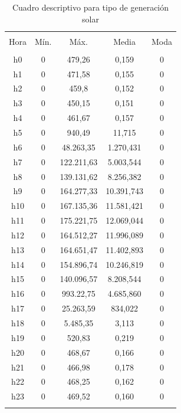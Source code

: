 \documentclass[conference, 10pt]{IEEEtran}
\begin{document}
\begin{table}[!htbp] \centering 
  \caption{Cuadro descriptivo para tipo de generación solar} 
  \label{} 
\begin{tabular}{@{\extracolsep{5pt}} ccccc} 
\\[-1.8ex]\hline 
\hline \\[-1.8ex] 
Hora & Mín. & Máx. & Media & Moda \\ 
\hline \\[-1.8ex] 
h0 & 0 & 479,26 & 0,159& 0 \\ 
h1 & 0 & 471,58 & 0,155& 0 \\ 
h2 & 0 & 459,8 & 0,152& 0 \\ 
h3 & 0 & 450,15 & 0,151& 0 \\ 
h4 & 0 & 461,67 & 0,157& 0 \\ 
h5 & 0 & 940,49 & 11,715 & 0 \\ 
h6 & 0 & 48.263,35 & 1.270,431& 0 \\ 
h7 & 0 & 122.211,63 & 5.003,544& 0 \\ 
h8 & 0 & 139.131,62 & 8.256,382& 0 \\ 
h9 & 0 & 164.277,33 & 10.391,743& 0 \\ 
h10 & 0 & 167.135,36 & 11.581,421& 0 \\ 
h11 & 0 & 175.221,75 & 12.069,044& 0 \\ 
h12 & 0 & 164.512,27 & 11.996,089& 0 \\ 
h13 & 0 & 164.651,47 & 11.402,893& 0 \\ 
h14 & 0 & 154.896,74 & 10.246,819& 0 \\ 
h15 & 0 & 140.096,57 & 8.208,544& 0 \\ 
h16 & 0 & 993.22,75 & 4.685,860& 0 \\ 
h17 & 0 & 25.263,59 & 834,022& 0 \\ 
h18 & 0 & 5.485,35 & 3,113& 0 \\ 
h19 & 0 & 520,83 & 0,219& 0 \\ 
h20 & 0 & 468,67 & 0,166& 0 \\ 
h21 & 0 & 466,98 & 0,178& 0 \\ 
h22 & 0 & 468,25 & 0,162& 0 \\ 
h23 & 0 & 469,52 & 0,160& 0 \\ \hline \\[-1.8ex] 
\end{tabular} 
\label{tab_18}
\end{table}
\end{document}
